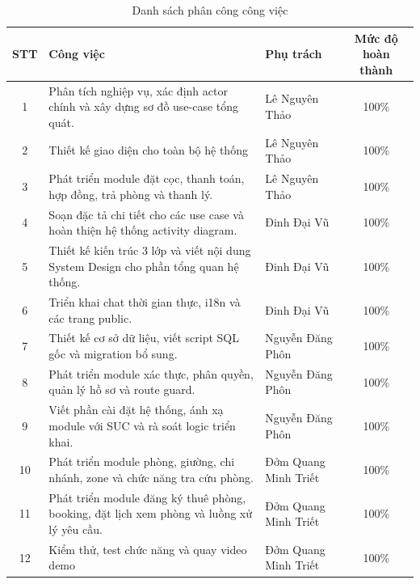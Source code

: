 \begin{table}[H]
    \centering
    \small
    \renewcommand{\arraystretch}{1.35}
    \begin{tabularx}{\textwidth}{|c|X|p{3.8cm}|c|}
        \hline
        \textbf{STT} & \textbf{Công việc} & \textbf{Phụ trách} & \textbf{Mức độ hoàn thành} \\ \hline
        1 & Phân tích nghiệp vụ, xác định actor chính và xây dựng sơ đồ use-case tổng quát. & Lê Nguyên Thảo & 100\% \\ \hline
        2 & Thiết kế giao diện cho toàn bộ hệ thống & Lê Nguyên Thảo & 100\% \\ \hline
        3 & Phát triển module đặt cọc, thanh toán, hợp đồng, trả phòng và thanh lý. & Lê Nguyên Thảo & 100\% \\ \hline
        4 & Soạn đặc tả chi tiết cho các use case và hoàn thiện hệ thống activity diagram. & Đinh Đại Vũ & 100\% \\ \hline
        5 & Thiết kế kiến trúc 3 lớp và viết nội dung System Design cho phần tổng quan hệ thống. & Đinh Đại Vũ & 100\% \\ \hline
        6 & Triển khai chat thời gian thực, i18n và các trang public. & Đinh Đại Vũ & 100\% \\ \hline
        7 & Thiết kế cơ sở dữ liệu, viết script SQL gốc và migration bổ sung. & Nguyễn Đăng Phôn & 100\% \\ \hline
        8 & Phát triển module xác thực, phân quyền, quản lý hồ sơ và route guard. & Nguyễn Đăng Phôn & 100\% \\ \hline
        9 & Viết phần cài đặt hệ thống, ánh xạ module với SUC và rà soát logic triển khai. & Nguyễn Đăng Phôn & 100\% \\ \hline
        10 & Phát triển module phòng, giường, chi nhánh, zone và chức năng tra cứu phòng. & Đởm Quang Minh Triết & 100\% \\ \hline
        11 & Phát triển module đăng ký thuê phòng, booking, đặt lịch xem phòng và luồng xử lý yêu cầu. & Đởm Quang Minh Triết & 100\% \\ \hline
        12 & Kiểm thử, test chức năng và quay video demo & Đởm Quang Minh Triết & 100\% \\ \hline
    
    \end{tabularx}
    \caption{Danh sách phân công công việc}
    \label{tab:phancong}
\end{table}



